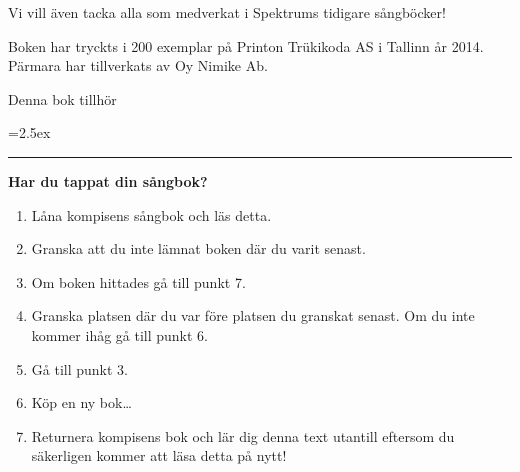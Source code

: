 \begin{footnotesize}
\begin{minipage}{\textwidth}
	    \vspace{.2cm}
	    
	    Vi vill även tacka alla som medverkat i Spektrums tidigare sångböcker!
		
		Boken har tryckts i 200 exemplar på Printon Trükikoda AS i Tallinn år 2014.
		Pärmara har tillverkats av Oy Nimike Ab.
	
	\end{minipage}
		
\end{footnotesize}

\newpage

\thispagestyle{empty}

\null
\vfill
\begin{center}
\end{center}

\newpage

\thispagestyle{empty}


\mbox{}

\vspace{2.3cm}\hspace{15.5mm}%
\begin{minipage}[t]{.7\textwidth}
    \ECFAugie
	\begin{center}
	    \hspace{1.5ex}\Huge Denna bok tillhör
	\end{center}
	

	\normalsize	
	
	\vspace{5ex}
	\parindent=2.5ex
	\rule{75mm}{0.4ex}
	
	\vspace{1.5ex}
	\textbf{Har du tappat din sångbok?}
	\vspace{1ex}
	\begin{enumerate}
		\parskip=0.5ex
		\item Låna kompisens sångbok och läs detta.
		\item Granska att du inte lämnat boken där du varit senast.
		\item Om boken hittades gå till punkt 7.
		\item Granska platsen där du var före platsen du granskat senast. Om du inte kommer ihåg gå till punkt 6.
		\item Gå till punkt 3.
		\item Köp en ny bok\ldots{}
		\item Returnera kompisens bok och lär dig denna text utantill eftersom du säkerligen kommer att läsa detta på nytt!
	\end{enumerate}
\end{minipage}

